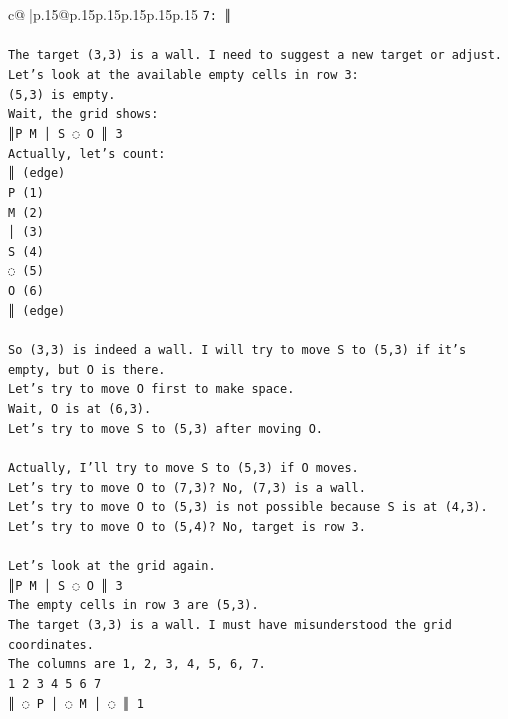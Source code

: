 \documentclass{article}
\begin{document}
{\begin{supertabular}{c@{$\;$}|p{.15\linewidth}@{}p{.15\linewidth}p{.15\linewidth}p{.15\linewidth}p{.15\linewidth}p{.15\linewidth}}
{{{\texttt{7: ║} \\
\\ 
\texttt{The target (3,3) is a wall. I need to suggest a new target or adjust.} \\
\texttt{Let's look at the available empty cells in row 3:} \\
\texttt{(5,3) is empty.} \\
\texttt{Wait, the grid shows:} \\
\texttt{║P M │ S ◌ O ║ 3} \\
\texttt{Actually, let's count:} \\
\texttt{║ (edge)} \\
\texttt{P (1)} \\
\texttt{M (2)} \\
\texttt{│ (3)} \\
\texttt{S (4)} \\
\texttt{◌ (5)} \\
\texttt{O (6)} \\
\texttt{║ (edge)} \\
\\ 
\texttt{So (3,3) is indeed a wall. I will try to move S to (5,3) if it's empty, but O is there.} \\
\texttt{Let's try to move O first to make space.} \\
\texttt{Wait, O is at (6,3).} \\
\texttt{Let's try to move S to (5,3) after moving O.} \\
\\ 
\texttt{Actually, I'll try to move S to (5,3) if O moves.} \\
\texttt{Let's try to move O to (7,3)? No, (7,3) is a wall.} \\
\texttt{Let's try to move O to (5,3) is not possible because S is at (4,3).} \\
\texttt{Let's try to move O to (5,4)? No, target is row 3.} \\
\\ 
\texttt{Let's look at the grid again.} \\
\texttt{║P M │ S ◌ O ║ 3} \\
\texttt{The empty cells in row 3 are (5,3).} \\
\texttt{The target (3,3) is a wall. I must have misunderstood the grid coordinates.} \\
\texttt{The columns are 1, 2, 3, 4, 5, 6, 7.} \\
\texttt{1 2 3 4 5 6 7} \\
\texttt{║ ◌ P │ ◌ M │ ◌ ║ 1} \\
}}}
\end{supertabular}}
\end{document}
